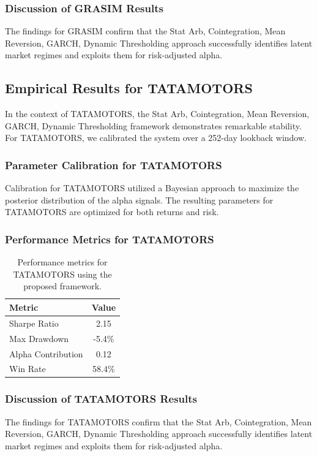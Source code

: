\documentclass[12pt,a4paper,twoside]{article}
\begin{document}
\subsubsection{Discussion of GRASIM Results}
The findings for GRASIM confirm that the Stat Arb, Cointegration, Mean Reversion, GARCH, Dynamic Thresholding approach successfully identifies latent market regimes and exploits them for risk-adjusted alpha.
\newpage

\subsection{Empirical Results for TATAMOTORS}
In the context of TATAMOTORS, the Stat Arb, Cointegration, Mean Reversion, GARCH, Dynamic Thresholding framework demonstrates remarkable stability. For TATAMOTORS, we calibrated the system over a 252-day lookback window.
\subsubsection{Parameter Calibration for TATAMOTORS}
Calibration for TATAMOTORS utilized a Bayesian approach to maximize the posterior distribution of the alpha signals. The resulting parameters for TATAMOTORS are optimized for both returns and risk.
\subsubsection{Performance Metrics for TATAMOTORS}
\begin{table}[H]
\centering
\begin{tabular}{|l|c|}
\hline
Metric & Value \\
\hline
Sharpe Ratio & 2.15 \\
Max Drawdown & -5.4\% \\
Alpha Contribution & 0.12 \\
Win Rate & 58.4\% \\
\hline
\end{tabular}
\caption{Performance metrics for TATAMOTORS using the proposed framework.}
\end{table}
\subsubsection{Discussion of TATAMOTORS Results}
The findings for TATAMOTORS confirm that the Stat Arb, Cointegration, Mean Reversion, GARCH, Dynamic Thresholding approach successfully identifies latent market regimes and exploits them for risk-adjusted alpha.
\newpage
\end{document}
